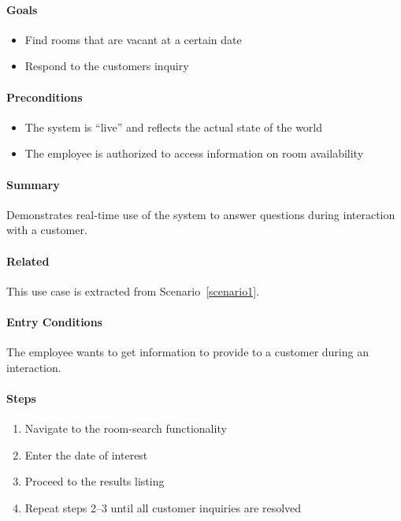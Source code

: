 \paragraph{Goals}\label{goals}

\begin{itemize}
\tightlist
\item
  Find rooms that are vacant at a certain date
\item
  Respond to the customers inquiry
\end{itemize}

\paragraph{Preconditions}\label{preconditions}

\begin{itemize}
\tightlist
\item
  The system is ``live'' and reflects the actual state of the world
\item
  The employee is authorized to access information on room availability
\end{itemize}

\paragraph{Summary}\label{summary}

Demonstrates real-time use of the system to answer questions during
interaction with a customer.

\paragraph{Related}\label{related}
This use case is extracted from Scenario~\ref{scenario1}.

\paragraph{Entry Conditions}\label{entry-conditions}

The employee wants to get information to provide to a customer during an
interaction.

\paragraph{Steps}\label{steps}

\begin{enumerate}
\def\labelenumi{\arabic{enumi}.}
\tightlist
\item
  Navigate to the room-search functionality
\item
  Enter the date of interest
\item
  Proceed to the results listing
\item
  Repeat steps 2--3 until all customer inquiries are resolved
\end{enumerate}

